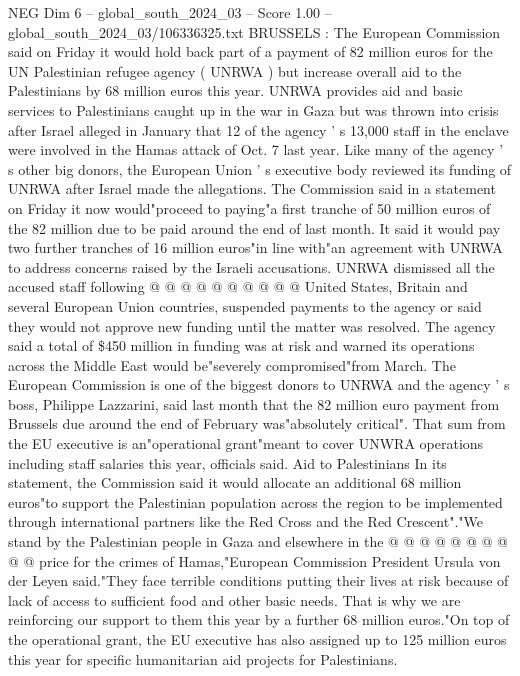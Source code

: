 \begin{textsample}{NEG Dim 6 – global\_south\_2024\_03 – Score 1.00 – global\_south\_2024\_03/106336325.txt}  \label{ex:f6_neg_409}
BRUSSELS : The European Commission said on Friday it would hold back part of a payment of 82 million euros for the UN Palestinian refugee agency ( UNRWA ) but increase overall aid to the Palestinians by 68 million euros this year.
UNRWA provides aid and basic services to Palestinians caught up in the war in Gaza but was thrown into crisis after Israel alleged in January that 12 of the agency ' s 13,000 staff in the enclave were involved in the Hamas attack of Oct. 7 last year.
Like many of the agency ' s other big donors, the European Union ' s executive body reviewed its funding of UNRWA after Israel made the allegations.
The Commission said in a statement on Friday it now would"proceed to paying"a first tranche of 50 million euros of the 82 million due to be paid around the end of last month.
It said it would pay two further tranches of 16 million euros"in line with"an agreement with UNRWA to address concerns raised by the Israeli accusations.
UNRWA dismissed all the accused staff following @ @ @ @ @ @ @ @ @ @ United States, Britain and several European Union countries, suspended payments to the agency or said they would not approve new funding until the matter was resolved.
The agency said a total of \$450 million in funding was at risk and warned its operations across the Middle East would be"severely compromised"from March.
The European Commission is one of the biggest donors to UNRWA and the agency ' s boss, Philippe Lazzarini, said last month that the 82 million euro payment from Brussels due around the end of February was"absolutely critical".
That sum from the EU executive is an"operational grant"meant to cover UNWRA operations including staff salaries this year, officials said.
Aid to Palestinians In its statement, the Commission said it would allocate an additional 68 million euros"to support the Palestinian population across the region to be implemented through international partners like the Red Cross and the Red Crescent"."We stand by the Palestinian people in Gaza and elsewhere in the @ @ @ @ @ @ @ @ @ @ price for the crimes of Hamas,"European Commission President Ursula von der Leyen said."They face terrible conditions putting their lives at risk because of lack of access to sufficient food and other basic needs.
That is why we are reinforcing our support to them this year by a further 68 million euros."On top of the operational grant, the EU executive has also assigned up to 125 million euros this year for specific humanitarian aid projects for Palestinians.

\end{textsample}
